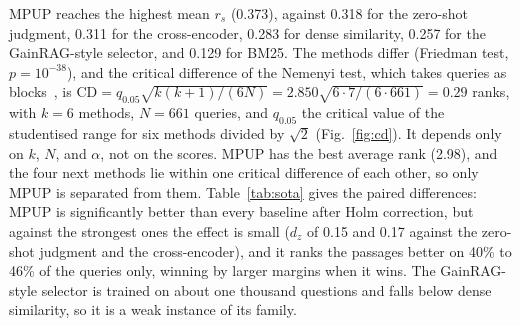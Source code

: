 \documentclass[conference]{IEEEtran}
\begin{document}
MPUP reaches the highest mean $r_s$ (0.373), against 0.318 for the zero-shot judgment, 0.311 for the cross-encoder, 0.283 for dense similarity, 0.257 for the GainRAG-style selector, and 0.129 for BM25. The methods differ (Friedman test, $p = 10^{-38}$), and the critical difference of the Nemenyi test, which takes queries as blocks~\cite{demsar2006}, is $\mathrm{CD} = q_{0.05}\sqrt{k(k+1)/(6N)} = 2.850\sqrt{6\cdot 7/(6\cdot 661)} = 0.29$ ranks, with $k = 6$ methods, $N = 661$ queries, and $q_{0.05}$ the critical value of the studentised range for six methods divided by $\sqrt{2}$ (Fig.~\ref{fig:cd}). It depends only on $k$, $N$, and $\alpha$, not on the scores. MPUP has the best average rank (2.98), and the four next methods lie within one critical difference of each other, so only MPUP is separated from them. Table~\ref{tab:sota} gives the paired differences: MPUP is significantly better than every baseline after Holm correction, but against the strongest ones the effect is small ($d_z$ of 0.15 and 0.17 against the zero-shot judgment and the cross-encoder), and it ranks the passages better on 40\% to 46\% of the queries only, winning by larger margins when it wins. The GainRAG-style selector is trained on about one thousand questions and falls below dense similarity, so it is a weak instance of its family.

\begin{table}[htbp]
    \centering
    \caption{Paired comparison of MPUP with each baseline on the 661 test queries of the third sample (laptop run, Qwen2.5-7B-Instruct 4-bit). $r_s$: mean within-query Spearman correlation (larger is better). Rank: average rank over queries among the six methods (1 is best). $\Delta r_s$: MPUP minus the baseline with its 95\% bootstrap interval (larger is better). $d_z$: standardised effect. $p_{\mathrm{H}}$: paired sign-flip permutation test with 200{,}000 flips, Holm-adjusted over the five comparisons (smaller is better; the smallest value it can resolve is about $5\times10^{-6}$).}
    \label{tab:sota}
    \footnotesize
\end{table}
\end{document}
